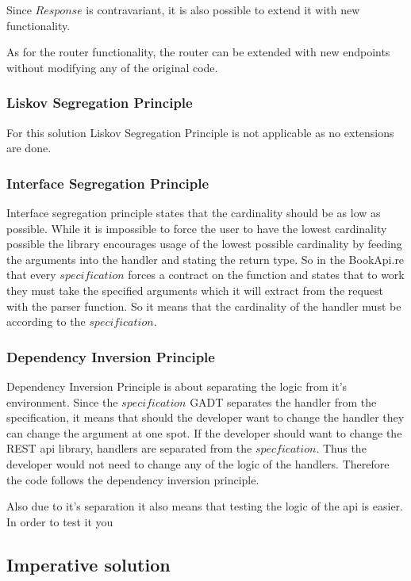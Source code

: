 Since $Response$ is contravariant, it is also possible to extend it with new
functionality.

As for the router functionality, the router can be extended with new endpoints
without modifying any of the original code.

\subsubsection{Liskov Segregation Principle}

For this solution Liskov Segregation Principle is not applicable as no
extensions are done.

\subsubsection{Interface Segregation Principle}

Interface segregation principle states that the cardinality should be as low as
possible.  While it is impossible to force the user to have the lowest
cardinality possible the library encourages usage of the lowest possible
cardinality by feeding the arguments into the handler and stating the return
type. So in the BookApi.re that every $specification$ forces a contract on the
function and states that to work they must take the specified arguments which
it will extract from the request with the parser function. So it means that the
cardinality of the handler must be according to the $specification$.

\subsubsection{Dependency Inversion Principle}

Dependency Inversion Principle is about separating the logic from it's
environment.  Since the $specification$ GADT separates the handler from the
specification, it means that should the developer want to change the handler
they can change the argument at one spot. If the developer should want to
change the REST api library, handlers are separated from the
$specfication$. Thus the developer would not need to change any of the logic of
the handlers. Therefore the code follows the dependency inversion principle.

Also due to it's separation it also means that testing the logic of the api 
is easier. In order to test it you 

\subsection{Imperative solution}


